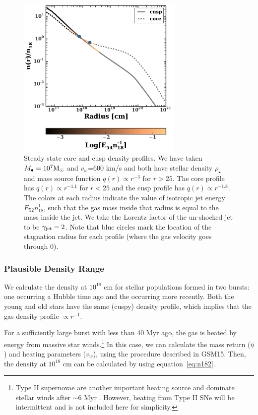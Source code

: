 \documentclass[usenatbib,fleqn]{mnras}
\newcommand{\Mbh}[1][]{M_{\bullet#1}}
\newcommand{\Msun}{{\rm M_\odot}}
\begin{document}
\begin{figure}
\includegraphics[width=8cm]{sedov_radius.pdf}
\caption{\label{fig:profiles} Steady state core and cusp density
  profiles. We have taken $\Mbh=10^{7} \Msun$ and $v_w$=600 km/s and
  both have stellar density $\rho_\star$ and mass source function
  $q(r) \propto r^{-3}$ for $r > 25$. The core profile has $q(r)
  \propto r^{-1.1}$ for $r < 25$ and the cusp profile has $q(r)
  \propto r^{-1.8}$.  The colors at each radius indicate the value of
  isotropic jet energy $E_{52} n_{18}^{1}$, such that the gas mass
  inside that radius is equal to the mass inside the jet. We take the
  Lorentz factor of the un-shocked jet to be $\gamma_{\rm jet}=2$.
  Note that blue circles mark the location of the stagnation radius
  for each profile (where the gas velocity goes through 0).}
\end{figure}



\subsubsection{Plausible Density Range}
\label{sec:densAllowed}

We calculate the density at $10^{18}$ cm for stellar populations
formed in two bursts: one occurring a Hubble time ago and the
occurring more recently.  Both the young and old stars have the same
(cuspy) density profile, which implies that the gas density profile
$\propto r^{-1}$.

For a sufficiently large burst with less than 40 Myr ago, the gas is
heated by energy from massive star winds.\footnote{Type II supernovae
  are another important heating source and dominate stellar winds
  after $\sim$6 Myr \citep{Voss+2009}. However, heating from Type II
  SNe will be intermittent and is not included here for simplicity.}
In this case, we can calculate the mass return ($\eta$) and heating
parameters ($v_w$), using the procedure described in GSM15. Then, the
density at $10^{18}$ cm can be calculated by using
equation~\eqref{eq:n182}.
\end{document}
